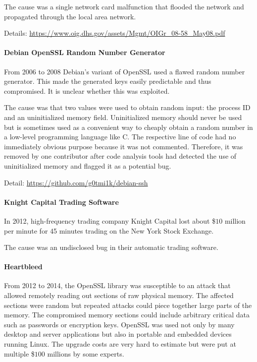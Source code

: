 The cause was a single network card malfunction that flooded the network and propagated through the local area network.

Details: \url{https://www.oig.dhs.gov/assets/Mgmt/OIGr_08-58_May08.pdf}

\paragraph{Debian OpenSSL Random Number Generator}
From 2006 to 2008 Debian's variant of OpenSSL used a flawed random number generator.
This made the generated keys easily predictable and thus compromised.
It is unclear whether this was exploited.

The cause was that two values were used to obtain random input: the process ID and an uninitialized memory field.
Uninitialized memory should never be used but is sometimes used as a convenient way to cheaply obtain a random number in a low-level programming language like C.
The respective line of code had no immediately obvious purpose because it was not commented.
Therefore, it was removed by one contributor after code analysis tools had detected the use of uninitialized memory and flagged it as a potential bug.

Detail: \url{https://github.com/g0tmi1k/debian-ssh}

\paragraph{Knight Capital Trading Software}
In 2012, high-frequency trading company Knight Capital lost about \$$10$ million per minute for 45 minutes trading on the New York Stock Exchange.

The cause was an undisclosed bug in their automatic trading software.

\paragraph{Heartbleed}
From 2012 to 2014, the OpenSSL library was susceptible to an attack that allowed remotely reading out sections of raw physical memory.
The affected sections were random but repeated attacks could piece together large parts of the memory.
The compromised memory sections could include arbitrary critical data such as passwords or encryption keys.
OpenSSL was used not only by many desktop and server applications but also in portable and embedded devices running Linux.
The upgrade costs are very hard to estimate but were put at multiple \$$100$ millions by some experts.

